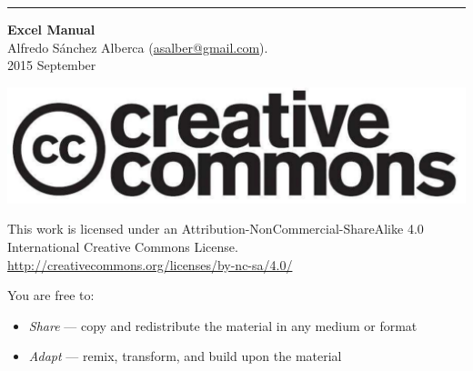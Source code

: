 \thispagestyle{empty}
\null
\vfill
\hrule depth 3pt
\smallskip
\sffamily
\noindent \textbf{Excel Manual}\\
Alfredo Sánchez Alberca (\url{asalber@gmail.com}).\\
2015 September
\smallskip

\begin{center}
\includegraphics[scale=0.1]{../img/cc-logo.pdf}
\end{center}

\smallskip

\small
This work is licensed under an Attribution-NonCommercial-ShareAlike 4.0 International Creative Commons License. 
\url{http://creativecommons.org/licenses/by-nc-sa/4.0/}

\smallskip

You are free to:
\begin{itemize}
\item \emph{Share} — copy and redistribute the material in any medium or format
\item \emph{Adapt} — remix, transform, and build upon the material
\end{itemize}

